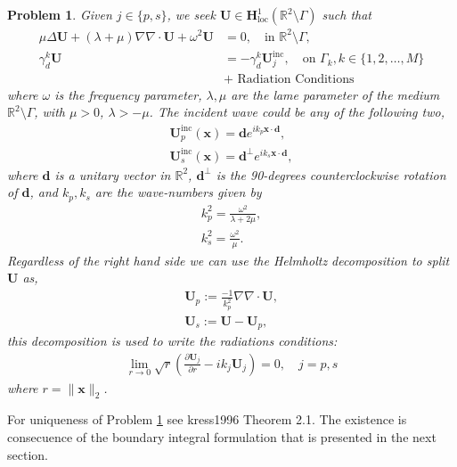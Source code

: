 \documentclass{article}
\newtheorem{problem}[theorem]{Problem}
\newcommand{\vx}{\bm{x}}
\newcommand{\IR}{{\mathbb R}}
\begin{document}
\begin{problem}
\label{prob:VolProb}
Given $j \in \{p,s\}$, we seek $ \mathbf{U} \in \mathbb{\mathbf{H}}^1_\text{loc}(\mathbb{R}^2\setminus \Gamma)$ such that  
\begin{align*}
\mu \Delta \mathbf{U}+ (\lambda +\mu) \nabla \nabla \cdot \mathbf{U} + \omega^2 \mathbf{U} &= 0, \quad \text{in } \mathbb{R}^2\setminus \Gamma, \\
\gamma^k_d \mathbf{U} &= -\gamma^k_d \mathbf{U}^\text{inc}_j, \quad \text{on } \Gamma_k, k \in \{1,2,\hdots, M\} \\
&\text{+ Radiation Conditions} 
\end{align*}
where $\omega$ is the frequency parameter, $\lambda , \mu $ are the lame parameter of the medium $\mathbb{R}^2\setminus \Gamma$, with $\mu >0$, $\lambda > -\mu$. The incident wave could be any of the following two, 
\begin{align*}
\mathbf{U}^\text{inc}_p(\mathbf{x}) = \mathbf{d} e^{i k_p \mathbf{x} \cdot \mathbf{d}}, \\
\mathbf{U}^\text{inc}_s(\mathbf{x}) = \mathbf{d}^\perp e^{i k_s \mathbf{x} \cdot \mathbf{d}},
\end{align*}
where $\mathbf{d}$ is a unitary vector in $\IR^2$, $\mathbf{d}^\perp$ is the 90-degrees counterclockwise rotation of $\mathbf{d}$, and $k_p, k_s$ are the wave-numbers given by 
\begin{align*}
k_p^2 = \frac{\omega^2}{\lambda+2\mu}, \\
k_s^2 = \frac{\omega^2}{\mu}.   
\end{align*}
Regardless of the right hand side we can use the Helmholtz decomposition to split $\mathbf{U}$ as, 
\begin{align*}
\mathbf{U}_p := \frac{-1}{k^2_p}\nabla \nabla \cdot \mathbf{U}, \\
\mathbf{U}_s := \mathbf{U} - \mathbf{U}_p,
\end{align*} 
this decomposition is used to write the radiations conditions: 
\begin{align*}
\lim_{r \rightarrow 0}\sqrt{r} \left(   
\frac{\partial \mathbf{U}_j }{\partial r}- i k_j \mathbf{U}_j
\right) = 0 ,\quad j = p,s
\end{align*}
where $r = \|\vx\|_2$. 
\end{problem} 

For uniqueness of Problem \ref{prob:VolProb} see kress1996 Theorem 2.1. The existence is consecuence of the boundary integral formulation that is presented in the next section. 
\end{document}

